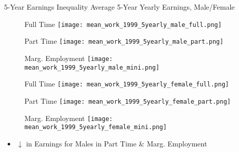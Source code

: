 \documentclass[hyperref={bookmarks=false}]{beamer}
\begin{document}
\begin{appendix}
\begin{frame}{5-Year Earnings Inequality}
Average 5-Year Yearly Earnings, Male/Female
\begin{figure}[!t]
\begin{minipage}[b]{0.32\textwidth}{Full Time}
\centering
\texttt{[image: mean\_work\_1999\_5yearly\_male\_full.png]}
\end{minipage}
\begin{minipage}[b]{0.32\textwidth}{Part Time}
\centering
\texttt{[image: mean\_work\_1999\_5yearly\_male\_part.png]}
\end{minipage}
\begin{minipage}[b]{0.32\textwidth}{Marg. Employment}
\centering
\texttt{[image: mean\_work\_1999\_5yearly\_male\_mini.png]}
\end{minipage}
\begin{minipage}[b]{0.32\textwidth}{Full Time}
\centering
\texttt{[image: mean\_work\_1999\_5yearly\_female\_full.png]}
\end{minipage}
\begin{minipage}[b]{0.32\textwidth}{Part Time}
\centering
\texttt{[image: mean\_work\_1999\_5yearly\_female\_part.png]}
\end{minipage}
\begin{minipage}[b]{0.32\textwidth}{Marg. Employment}
\centering
\texttt{[image: mean\_work\_1999\_5yearly\_female\_mini.png]}
\end{minipage}
\end{figure}
\begin{itemize}
\item $\downarrow$ in Earnings for Males in Part Time \& Marg. Employment 
\end{itemize}
\end{frame}


\end{appendix}
\end{document}
